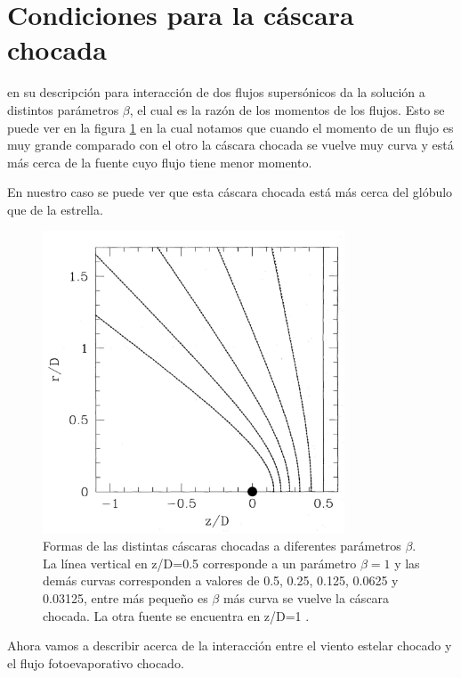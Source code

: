 \documentclass{book}
\begin{document}
\section{Condiciones para la cáscara chocada}

\cite{Canto:1996} en su descripción para interacción de dos flujos supersónicos da la solución a distintos parámetros $\beta$, el cual es la razón de los momentos de los flujos. Esto se puede ver en la figura \ref{fig:Canto2} en la cual notamos que cuando el momento de un flujo es muy  grande comparado con el otro la cáscara chocada se vuelve muy curva y está más cerca de la fuente cuyo flujo tiene menor momento.

En nuestro caso se puede ver que esta cáscara chocada está más cerca del glóbulo que de la estrella.

\begin{figure}[h]
    \centering    \includegraphics[width=0.8\textwidth]{images Chapter 2/C2_Canto2.jpg}
    \caption{Formas de las distintas cáscaras chocadas a diferentes parámetros $\beta$. La línea vertical en z/D=0.5 corresponde a un parámetro $\beta=1$ y las demás curvas corresponden a valores de 0.5, 0.25, 0.125, 0.0625 y 0.03125, entre más pequeño es $\beta$ más curva se vuelve la cáscara chocada. La otra fuente se encuentra en z/D=1 \citep{Canto:1996}.}
    \label{fig:Canto2}
\end{figure}

Ahora vamos a describir acerca de la interacción entre el viento estelar chocado y el flujo fotoevaporativo chocado. 
\end{document}
